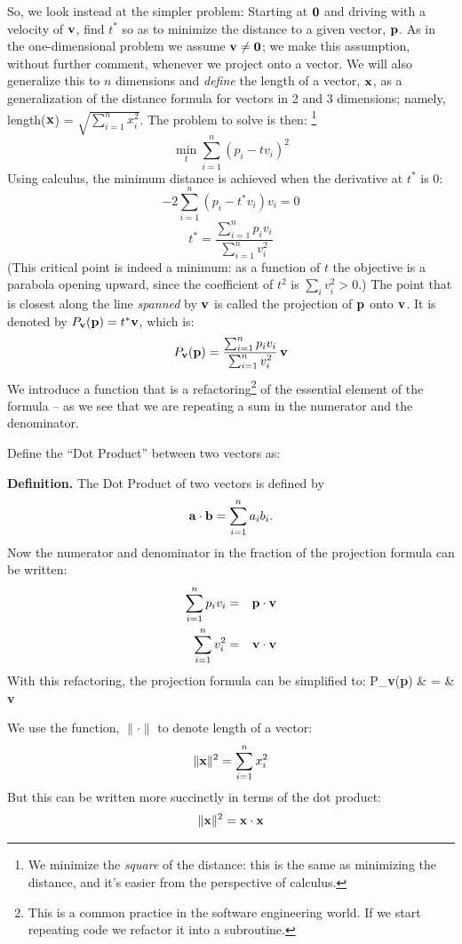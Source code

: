 \documentclass[12pt]{article}
\begin{document}
So, we look instead at the simpler problem: Starting at ${\bf 0}$ and
driving with a velocity of ${\bf v}$, find $t^*$ so as to minimize the
distance to a given vector, ${\bf p}$.
As in the one-dimensional problem we assume ${\bf v} \neq {\bf 0}$; we make
this assumption, without further comment, whenever we project onto a vector.
We will also generalize this to $n$ dimensions and {\em define\/} the 
length of a vector, ${\bf x}$, as a generalization of the distance formula 
for vectors in 2 and 3  dimensions; namely, 
length(${\bf x}$) = $\sqrt{\sum_{i=1}^n x_i^2}$.
The problem to solve is then:%
\footnote{We minimize the {\em square\/} of the distance: this is the same
as minimizing the distance, and it's easier from the perspective of calculus.}
$$ \min_{t} \sum_{i=1}^n (p_i - t v_i)^2 $$
Using calculus, the minimum distance is achieved when the derivative
at $t^*$ is $0$:
$$ -2 \sum_{i=1}^n (p_i - t^* v_i)v_i = 0$$
$$t^* = \frac{\sum_{i=1}^n p_i v_i}{\sum_{i=1}^n v_i^2}$$
(This critical point is indeed a minimum: as a function of $t$ the objective
is a parabola opening upward, since the coefficient of $t^2$ is
$\sum_i v_i^2 > 0$.)
The point that is closest along the line {\em spanned\/} by ${\bf v}$ is
called the projection of ${\bf p}$ onto ${\bf v}$.
It is denoted by $P_{\bf v}({\bf p}) = t^* {\bf v}$, which is:
$$ P_{\bf v}({\bf p}) = \frac{\sum_{i=1}^n p_i v_i}{\sum_{i=1}^n v_i^2} \, {\bf v} $$
We introduce a function that is a refactoring\footnote{This is a common 
practice in the software engineering world. If we start repeating code we 
refactor it into a subroutine.} of the essential element of the formula  -- as 
we see that we are repeating a sum in the numerator and the denominator.

Define the ``Dot Product'' between two vectors as: 

{\bf Definition.} The Dot Product of two vectors is defined by
$${\bf a} \cdot {\bf b} = \sum_{i=1}^n a_i b_i.$$
Now the numerator and denominator in the fraction of the projection 
formula can be written:
\begin{eqnarray*}
  \sum_{i=1}^n p_i v_i & = & {\bf p} \cdot {\bf v} \\
  \sum_{i=1}^n v_i^2 & = & {\bf v} \cdot {\bf v}
\end{eqnarray*}
With this refactoring, the projection formula can be simplified to:
\be
  P_{\bf v}({\bf p}) & = &  {\bf v}
\ee

We use the function, $\| \cdot \|$ to denote length of a vector:
$$ \|{\bf x}\|^2 = \sum_{i=1}^n x_i^2$$
But this can be written more succinctly in terms of the dot product: 
$$ \|{\bf x}\|^2 = {\bf x} \cdot {\bf x} $$
\end{document}

